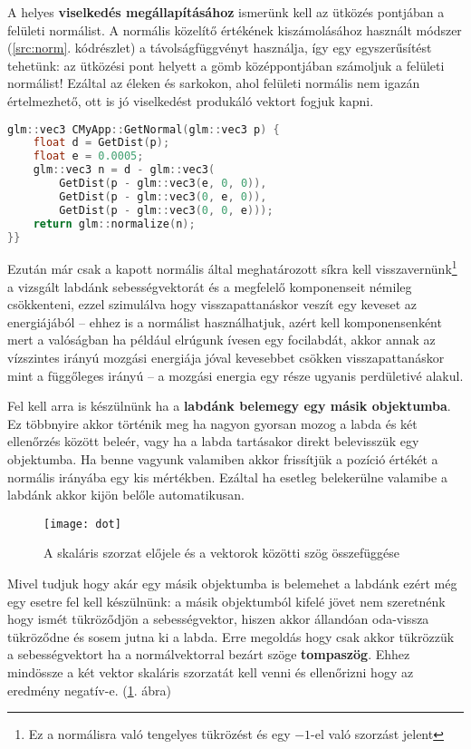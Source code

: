A helyes \textbf{viselkedés megállapításához} ismerünk kell az ütközés pontjában a felületi normálist. A normális közelítő értékének kiszámolásához használt módszer (\ref{src:norm}. kódrészlet) a távolságfüggvényt használja, így egy egyszerűsítést tehetünk: az ütközési pont helyett a gömb középpontjában számoljuk a felületi normálist! Ezáltal az éleken és sarkokon, ahol felületi normális nem igazán értelmezhető, ott is jó viselkedést produkáló vektort fogjuk kapni.

\begin{lstlisting}[language={C++}]
glm::vec3 CMyApp::GetNormal(glm::vec3 p) {
	float d = GetDist(p);
	float e = 0.0005;
	glm::vec3 n = d - glm::vec3(
		GetDist(p - glm::vec3(e, 0, 0)),
		GetDist(p - glm::vec3(0, e, 0)),
		GetDist(p - glm::vec3(0, 0, e)));
	return glm::normalize(n);
}}
\end{lstlisting}

Ezután már csak a kapott normális által meghatározott síkra kell visszavernünk\footnote{Ez a normálisra való tengelyes tükrözést és egy $-1$-el való szorzást jelent} a vizsgált labdánk sebességvektorát és a megfelelő komponenseit némileg csökkenteni, ezzel szimulálva hogy visszapattanáskor veszít egy keveset az energiájából -- ehhez is a normálist használhatjuk, azért kell komponensenként mert a valóságban ha például elrúgunk ívesen egy focilabdát, akkor annak az vízszintes irányú mozgási energiája jóval kevesebbet csökken visszapattanáskor mint a függőleges irányú -- a mozgási energia egy része ugyanis perdületivé alakul.

Fel kell arra is készülnünk ha a \textbf{labdánk belemegy egy másik objektumba}. Ez többnyire akkor történik meg ha nagyon gyorsan mozog a labda és két ellenőrzés között beleér, vagy ha a labda tartásakor direkt belevisszük egy objektumba. Ha benne vagyunk valamiben akkor frissítjük a pozíció értékét a normális irányába egy kis mértékben. Ezáltal ha esetleg belekerülne valamibe a labdánk akkor kijön belőle automatikusan.

\begin{figure}[H]
	\centering
	\texttt{[image: dot]}
	\caption{A skaláris szorzat előjele és a vektorok közötti szög összefüggése \cite{13DotPro51:online}}
	\label{fig:dot}
\end{figure}

Mivel tudjuk hogy akár egy másik objektumba is belemehet a labdánk ezért még egy esetre fel kell készülnünk: a másik objektumból kifelé jövet nem szeretnénk hogy ismét tükröződjön a sebességvektor, hiszen akkor állandóan oda-vissza tükröződne és sosem jutna ki a labda. Erre megoldás hogy csak akkor tükrözzük a sebességvektort ha a normálvektorral bezárt szöge \textbf{tompaszög}. Ehhez mindössze a két vektor skaláris szorzatát kell venni és ellenőrizni hogy az eredmény negatív-e. (\ref{fig:dot}. ábra)

